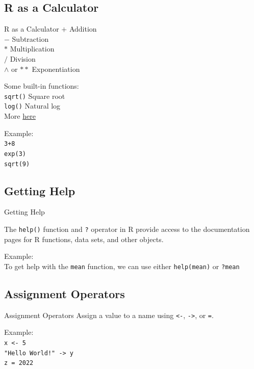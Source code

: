 \documentclass{beamer}
\begin{document}
\subsection{R as a Calculator}
\begin{frame}{R as a Calculator}
$+$ Addition\\
$-$ Subtraction\\
$*$ Multiplication\\
$/$ Division\\
$\wedge$ or $**$ Exponentiation\\
\hfill


Some built-in functions:\\
\texttt{sqrt()} Square root\\
\texttt{log()} Natural log\\
More \href{https://www.javatpoint.com/r-built-in-functions}{here}\\
\hfill

Example:\\
\texttt{3+8}\\
\texttt{exp(3)}\\
\texttt{sqrt(9)}
\end{frame}

\subsection{Getting Help}
\begin{frame}{Getting Help}

The \texttt{help()} function and \texttt{?} operator in R provide access to the documentation pages for R functions, data sets, and other objects.\\
\hfill

Example:\\
To get help with the \texttt{mean} function, we can use either
\texttt{help(mean)}
or 
\texttt{?mean}
    
\end{frame}

\subsection{Assignment Operators}

\begin{frame}{Assignment Operators}
Assign a value to a name using \texttt{<-}, \texttt{->}, or \texttt{=}.\\
\hfill

Example:\\
\texttt{x <- 5}\\
\texttt{"Hello World!" -> y}\\
\texttt{z = 2022}
\end{frame}
\end{document}
